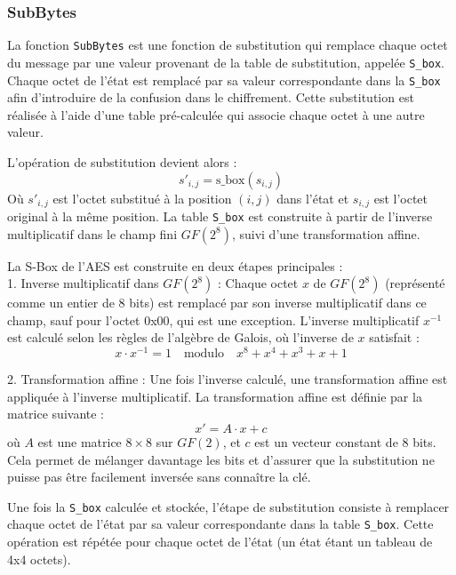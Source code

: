\documentclass[a4paper, 10pt]{article}
\begin{document}
\subsubsection{SubBytes}
La fonction \texttt{SubBytes} est une fonction de substitution qui remplace chaque octet du message par une valeur provenant de la table de substitution, appelée \texttt{S\_box}. Chaque octet de l'état est remplacé par sa valeur correspondante dans la \texttt{S\_box} afin d’introduire de la confusion dans le chiffrement. Cette substitution est réalisée à l'aide d'une table pré-calculée qui associe chaque octet à une autre valeur.

L'opération de substitution devient alors :
\[
  s'_{i,j} = \text{s\_box}(s_{i,j})
\]
Où \( s'_{i,j} \) est l'octet substitué à la position \( (i,j) \) dans l'état et \( s_{i,j} \) est l'octet original à la même position. La table \texttt{S\_box} est construite à partir de l'inverse multiplicatif dans le champ fini \( GF(2^8) \), suivi d'une transformation affine.

La S-Box de l'AES est construite en deux étapes principales :\\
1. Inverse multiplicatif dans \( GF(2^8) \) : Chaque octet \( x \) de \( GF(2^8) \) (représenté comme un entier de 8 bits) est remplacé par son inverse multiplicatif dans ce champ, sauf pour l'octet 0x00, qui est une exception. L'inverse multiplicatif \( x^{-1} \) est calculé selon les règles de l'algèbre de Galois, où l'inverse de \( x \) satisfait :
   \[
   x \cdot x^{-1} = 1 \quad \text{modulo} \quad x^8 + x^4 + x^3 + x + 1
   \]
   
2. Transformation affine : Une fois l'inverse calculé, une transformation affine est appliquée à l'inverse multiplicatif. La transformation affine est définie par la matrice suivante :
   \[
   x' = A \cdot x + c
   \]
   où \( A \) est une matrice \( 8 \times 8 \) sur \( GF(2) \), et \( c \) est un vecteur constant de 8 bits. Cela permet de mélanger davantage les bits et d'assurer que la substitution ne puisse pas être facilement inversée sans connaître la clé.

Une fois la \texttt{S\_box} calculée et stockée, l'étape de substitution consiste à remplacer chaque octet de l'état par sa valeur correspondante dans la table \texttt{S\_box}. Cette opération est répétée pour chaque octet de l'état (un état étant un tableau de 4x4 octets).
\end{document}
